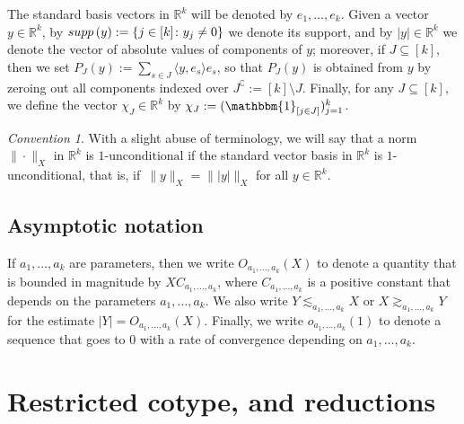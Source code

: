 \documentclass[11pt,leqno]{amsart}
\theoremstyle{remark}
\newtheorem{convention}[theorem]{Convention}
\theoremstyle{plain}
\newcommand{\R}{\mathbb{R}}
\newcommand{\supp}{{\rm supp\,}}
\begin{document}
The standard basis vectors in $\R^k$ will be denoted by $e_1,\dots,e_k$.
Given a vector $y\in\R^k$, by $\supp(y):=\{j\in [k]\colon y_j\neq 0\}$ we denote its support,
and by $|y|\in \mathbb{R}^k$ we denote the vector of absolute values of components of $y$;
moreover, if $J\subseteq [k]$, then we set $P_J(y):=\sum_{s\in J}\langle y,e_s\rangle e_s$,
so that $P_J(y)$ is obtained from $y$ by zeroing out all components indexed over $J^\complement:= [k]\setminus J$.
Finally, for any $J \subseteq [k]$, we define the vector $\chi_J \in \R^k$ by
$\chi_J:= (\mathbbm{1}_{[j \in J]})_{j=1}^k$.
\begin{convention}
With a slight abuse of terminology, we will say that a norm $\|\cdot\|_X$ in $\R^k$ is $1\text{-unconditional}$
if the standard vector basis in $\R^k$ is $1$-unconditional, that is, if\, $\|y\|_X =\big\||y|\big\|_X$ for all $y\in\R^k$.
\end{convention}

\subsection{Asymptotic notation}

If $a_1,\dots,a_k$ are parameters, then we write $O_{a_1,\dots,a_k}(X)$ to denote a quantity that is bounded in magnitude
by $X C_{a_1,\dots,a_k}$, where $C_{a_1,\dots,a_k}$ is a positive constant that depends on the parameters $a_1,\dots,a_k$.
We also write $Y\lesssim_{a_1,\dots,a_k}\!X$ or $X\gtrsim_{a_1,\dots,a_k}\!Y$ for the estimate $|Y|=O_{a_1,\dots,a_k}(X)$.
Finally, we write $o_{a_1,\dots,a_k}(1)$ to denote a sequence that goes to $0$ with a rate of convergence depending
on $a_1,\dots,a_k$.

\section{Restricted cotype, and reductions} \label{sec3}
\end{document}
